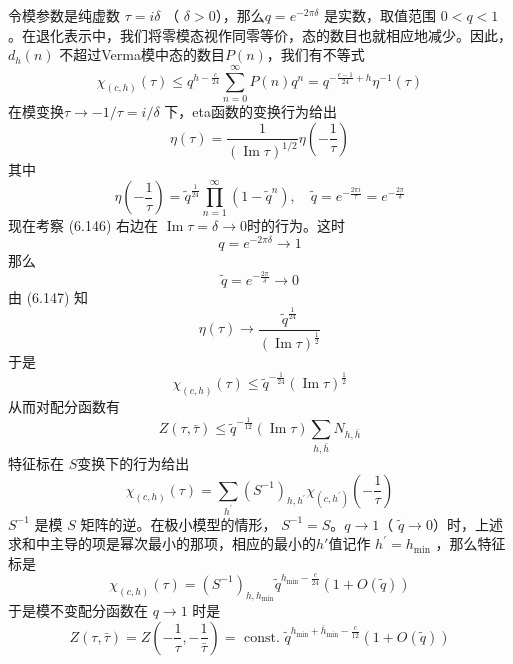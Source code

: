 令模参数是纯虚数 $\tau=i \delta$ （ $\delta>0 $），那么$ q=e^{-2 \pi \delta}$ 是实数，取值范围 $0<q<1 $。在退化表示中，我们将零模态视作同零等价，态的数目也就相应地减少。因此，$ d_{h}(n)$ 不超过Verma模中态的数目$ P(n) $，我们有不等式
\begin{equation}
	\chi_{(c, h)}(\tau) \leq q^{h-\frac{c}{24}} \sum_{n=0}^{\infty} P(n) q^{n}=q^{-\frac{c-1}{24}+h} \eta^{-1}(\tau)
\end{equation} 
在模变换$ \tau \rightarrow- 1/\tau=i/\delta$ 下，eta函数的变换行为给出
\begin{equation}
	\eta(\tau)=\frac{1}{(\operatorname{Im} \tau)^{1 / 2}} \eta\left(-\frac{1}{\tau}\right)
\end{equation} 
其中
\begin{equation}
	\eta\left(-\frac{1}{\tau}\right)=\tilde{q}^{\frac{1}{24}} \prod_{n=1}^{\infty}\left(1-\tilde{q}^{n}\right), \quad \tilde{q}=e^{-\frac{2 \pi i}{\tau}}=e^{-\frac{2 \pi}{\delta}}
\end{equation}
现在考察 (6.146) 右边在 $\operatorname{Im} \tau=\delta \rightarrow 0 $时的行为。这时
\begin{equation}
	q=e^{-2 \pi \delta} \rightarrow 1
\end{equation}
那么
\begin{equation}
	\tilde{q}=e^{-\frac{2 \pi}{\delta}} \rightarrow 0 
\end{equation}
由 (6.147) 知
\begin{equation}
	\eta(\tau) \rightarrow \frac{\tilde{q}^{\frac{1}{24}}}{(\operatorname{Im} \tau)^{\frac{1}{2}}}
\end{equation}
于是
\begin{equation}
	\chi_{(c, h)}(\tau) \leq \tilde{q}^{-\frac{1}{24}}(\operatorname{Im} \tau)^{\frac{1}{2}}
\end{equation}
从而对配分函数有
\begin{equation}
	Z(\tau, \bar{\tau}) \leq \tilde{q}^{-\frac{1}{12}}(\operatorname{Im} \tau) \sum_{h, \bar{h}} N_{h, \bar{h}}
\end{equation} 
特征标在 $S $变换下的行为给出
\begin{equation}
	\chi_{(c, h)}(\tau)=\sum_{h^{\prime}}\left(S^{-1}\right)_{h, h^{\prime}} \chi_{\left(c, h^{\prime}\right)}\left(-\frac{1}{\tau}\right) 
\end{equation}
$S^{-1}$ 是模 $S$ 矩阵的逆。在极小模型的情形， $S^{-1}=S $。$ q \rightarrow 1 $（ $\tilde{q} \rightarrow 0 $）时，上述求和中主导的项是幂次最小的那项，相应的最小的$ h' $值记作 $h^{\prime}=h_{\min }$ ，那么特征标是
\begin{equation}
	\chi_{(c, h)}(\tau)=\left(S^{-1}\right)_{h, h_{\min }} \tilde{q}^{h_{\min }-\frac{c}{24}}(1+O(\tilde{q})) 
\end{equation}
于是模不变配分函数在 $q \rightarrow 1$ 时是
\begin{equation}
	Z(\tau, \bar{\tau})=Z\left(-\frac{1}{\tau},-\frac{1}{\bar{\tau}}\right)=\text { const. } \tilde{q}^{h_{\min }+\bar{h}_{\min }-\frac{c}{12}}(1+O(\tilde{q}))
\end{equation} 


